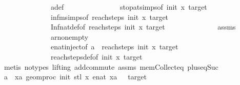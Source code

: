 \begin{isabellebody}
\ \ \ \ \ \ \ \ \ \ \ \ \ \ a{\isacharunderscore}{\kern0pt}def\ \isanewline
\ \ \ \ \ \ \ \ \ \ \ \ \ \ stop{\isacharunderscore}{\kern0pt}at{\isachardot}{\kern0pt}simps{\isacharbrackleft}{\kern0pt}of\ init\ x\ target{\isacharbrackright}{\kern0pt}\ \isanewline
\ \ \ \ \ \ \ \ \ \ \ \ \ \ infm{\isachardot}{\kern0pt}simps{\isacharbrackleft}{\kern0pt}of\ {\isachardoublequoteopen}reach{\isacharunderscore}{\kern0pt}steps\ init\ x\ target{\isachardoublequoteclose}{\isacharbrackright}{\kern0pt}\isanewline
\ \ \ \ \ \ \ \ \ \ \ \ \ \ Inf{\isacharunderscore}{\kern0pt}nat{\isacharunderscore}{\kern0pt}def{}{\isacharbrackleft}{\kern0pt}of\ {\isachardoublequoteopen}reach{\isacharunderscore}{\kern0pt}steps\ init\ x\ target{\isachardoublequoteclose}{\isacharbrackright}{\kern0pt}\isanewline
\ \ \ \ \ \ \ \ \ \ \ \ \ \ assms{\isacharparenleft}{\kern0pt}{}{\isacharparenright}{\kern0pt}\isanewline
\ \ \ \ \ \ \ \ \ \ \ \ \ \ ar{\isacharunderscore}{\kern0pt}nonempty\isanewline
\ \ \ \ \ \ \ \ \ \ \ \ \ \ enat{\isachardot}{\kern0pt}inject{\isacharbrackleft}{\kern0pt}of\ a\ {\isachardoublequoteopen}{\isasymSqinter}\ reach{\isacharunderscore}{\kern0pt}steps\ init\ x\ target{\isachardoublequoteclose}{\isacharbrackright}{\kern0pt}\isanewline
\ \ \ \ \ \ \ \ \ \ \ \ \ \ reach{\isacharunderscore}{\kern0pt}steps{\isacharunderscore}{\kern0pt}def{\isacharbrackleft}{\kern0pt}of\ init\ x\ target{\isacharbrackright}{\kern0pt}\isanewline
\ \ \ \ \ \ \ \ \isamarkupfalse%
\ {\isacharparenleft}{\kern0pt}metis\ {\isacharparenleft}{\kern0pt}no{\isacharunderscore}{\kern0pt}types{\isacharcomma}{\kern0pt}\ lifting{\isacharparenright}{\kern0pt}\ add{\isachardot}{\kern0pt}commute\ assms{\isacharparenleft}{\kern0pt}{}{\isacharparenright}{\kern0pt}\ mem{\isacharunderscore}{\kern0pt}Collect{\isacharunderscore}{\kern0pt}eq\ plus{\isacharunderscore}{\kern0pt}{}{\isacharunderscore}{\kern0pt}eq{\isacharunderscore}{\kern0pt}Suc{\isacharparenright}{\kern0pt}\isanewline
\ \ \ \ \ \ \isamarkupfalse%
\ \isamarkupfalse%
\ {\isachardoublequoteopen}a{\isacharprime}{\kern0pt}\ {\isasymin}\ {\isacharbraceleft}{\kern0pt}xa{\isachardot}{\kern0pt}\ geom{\isacharunderscore}{\kern0pt}proc\ init{\isacharprime}{\kern0pt}\ {\isacharparenleft}{\kern0pt}stl\ x{\isacharparenright}{\kern0pt}\ {\isacharparenleft}{\kern0pt}enat\ xa{\isacharparenright}{\kern0pt}\ {\isasymin}\ {\isacharbraceleft}{\kern0pt}{}{\isacharcomma}{\kern0pt}\ target{\isacharbraceright}{\kern0pt}{\isacharbraceright}{\kern0pt}{\isachardoublequoteclose}\isanewline

\end{isabellebody}
